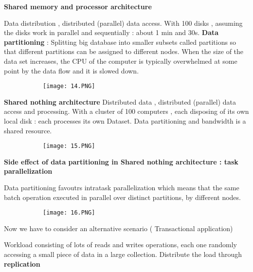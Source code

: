 \documentclass{article}
\begin{document}
\textbf{Shared memory and processor architecture}

Data distribution , distributed (parallel) data access. With 100 disks , assuming the disks work in parallel and sequentially : about 1 min and 30s.
\textbf{Data partitioning} : Splitting big database into smaller subsets called partitions so that different partitions can be assigned to different nodes.
When the size of the data set increases, the CPU of the computer is typically overwhelmed at some point by the data flow and it is slowed down.

\begin{figure}[ht!]
  \centering
  \begin{subfigure}[b]{0.3\linewidth}
    \texttt{[image: 14.PNG]}
  \end{subfigure}
\end{figure}


\textbf{Shared nothing architecture}
Distributed data , distributed (parallel) data access and processing. With a cluster of 100 computers , each disposing of its own local disk : each processes its own Dataset. Data partitioning and bandwidth is a shared resource.

\begin{figure}[ht!]
  \centering
  \begin{subfigure}[b]{0.4\linewidth}
    \texttt{[image: 15.PNG]}
  \end{subfigure}
\end{figure}

\textbf{Side effect of data partitioning in Shared  nothing architecture : task parallelization}

Data partitioning favoutrs intratask parallelization which means that the same batch operation executed in parallel over distinct partitions, by different nodes.

\begin{figure}[ht!]
  \centering
  \begin{subfigure}[b]{0.35\linewidth}
    \texttt{[image: 16.PNG]}
  \end{subfigure}
\end{figure}

Now we have to consider an alternative scenario ( Transactional application)

Workload consisting of lots of reads and writes operations, each one randomly accessing a small piece of data in a large collection. Distribute the load through \textbf{replication}
\end{document}
